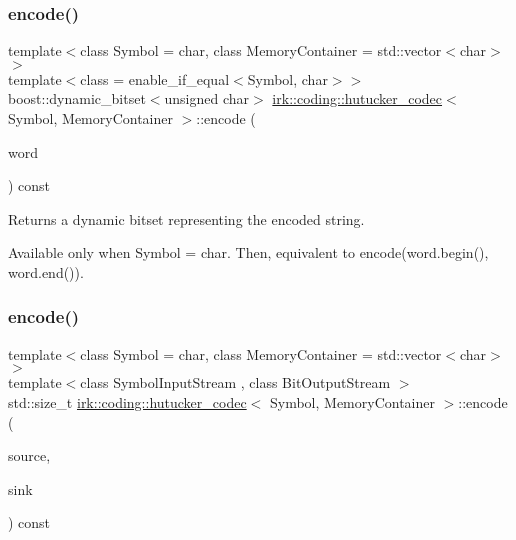 \subsubsection{\texorpdfstring{encode()}{encode()}\hspace{0.1cm}{\footnotesize\ttfamily [2/3]}}
{\footnotesize\ttfamily template$<$class Symbol  = char, class Memory\+Container  = std\+::vector$<$char$>$$>$ \\
template$<$class  = enable\+\_\+if\+\_\+equal$<$\+Symbol, char$>$$>$ \\
boost\+::dynamic\+\_\+bitset$<$unsigned char$>$ \mbox{\hyperlink{classirk_1_1coding_1_1hutucker__codec}{irk\+::coding\+::hutucker\+\_\+codec}}$<$ Symbol, Memory\+Container $>$\+::encode (\begin{DoxyParamCaption}\item[{const std\+::string \&}]{word }\end{DoxyParamCaption}) const\hspace{0.3cm}{\ttfamily [inline]}}



Returns a dynamic bitset representing the encoded string. 

Available only when {\ttfamily Symbol = char}. Then, equivalent to {\ttfamily encode(word.\+begin(), word.\+end())}. \mbox{\label{classirk_1_1coding_1_1hutucker__codec_a536d7952971781338612f77d4a689915}} 
\subsubsection{\texorpdfstring{encode()}{encode()}\hspace{0.1cm}{\footnotesize\ttfamily [3/3]}}
{\footnotesize\ttfamily template$<$class Symbol  = char, class Memory\+Container  = std\+::vector$<$char$>$$>$ \\
template$<$class Symbol\+Input\+Stream , class Bit\+Output\+Stream $>$ \\
std\+::size\+\_\+t \mbox{\hyperlink{classirk_1_1coding_1_1hutucker__codec}{irk\+::coding\+::hutucker\+\_\+codec}}$<$ Symbol, Memory\+Container $>$\+::encode (\begin{DoxyParamCaption}\item[{Symbol\+Input\+Stream \&}]{source,  }\item[{Bit\+Output\+Stream \&}]{sink }\end{DoxyParamCaption}) const\hspace{0.3cm}{\ttfamily [inline]}}



